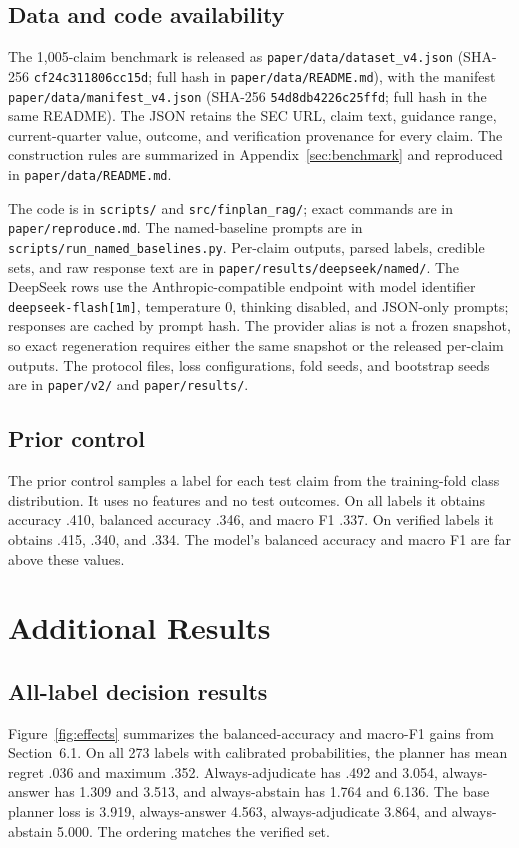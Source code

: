 \documentclass[11pt]{article}
\begin{document}
\subsection{Data and code availability}
\label{app:availability}
The 1,005-claim benchmark is released as
\texttt{paper/data/dataset\_v4.json} (SHA-256
\texttt{cf24c311806cc15d}; full hash in \texttt{paper/data/README.md}),
with the manifest \texttt{paper/data/manifest\_v4.json} (SHA-256
\texttt{54d8db4226c25ffd}; full hash in the same README).
The JSON retains the SEC URL, claim text, guidance range, current-quarter
value, outcome, and verification provenance for every claim. The construction
rules are summarized in Appendix~\ref{sec:benchmark} and reproduced in
\texttt{paper/data/README.md}.

The code is in \texttt{scripts/} and \texttt{src/finplan\_rag/}; exact
commands are in \texttt{paper/reproduce.md}. The named-baseline prompts are in
\texttt{scripts/run\_named\_baselines.py}. Per-claim outputs, parsed labels,
credible sets, and raw response text are in
\texttt{paper/results/deepseek/named/}. The DeepSeek rows use the
Anthropic-compatible endpoint with model identifier
\texttt{deepseek-flash[1m]}, temperature 0, thinking disabled, and JSON-only
prompts; responses are cached by prompt hash. The provider alias is not a
frozen snapshot, so exact regeneration requires either the same snapshot or the
released per-claim outputs. The protocol files, loss configurations, fold
seeds, and bootstrap seeds are in \texttt{paper/v2/} and
\texttt{paper/results/}.

\subsection{Prior control}
The prior control samples a label for each test claim from the training-fold class distribution. It uses no features and no test outcomes. On all labels it obtains accuracy .410, balanced accuracy .346, and macro F1 .337. On verified labels it obtains .415, .340, and .334. The model's balanced accuracy and macro F1 are far above these values.

\section{Additional Results}
\label{app:additional}

\subsection{All-label decision results}
Figure~\ref{fig:effects} summarizes the balanced-accuracy and macro-F1 gains from Section~6.1. On all 273 labels with calibrated probabilities, the planner has mean regret .036 and maximum .352. Always-adjudicate has .492 and 3.054, always-answer has 1.309 and 3.513, and always-abstain has 1.764 and 6.136. The base planner loss is 3.919, always-answer 4.563, always-adjudicate 3.864, and always-abstain 5.000. The ordering matches the verified set.
\end{document}
